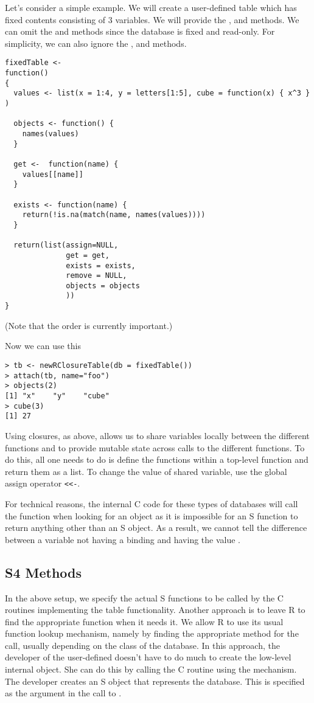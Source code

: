 \documentclass{article}
\begin{document}
Let's consider a simple example. We will create a user-defined table
which has fixed contents consisting of $3$ variables.  We will provide
the ,  and 
methods. We can omit the  and 
methods since the database is fixed and read-only.  For simplicity, we
can also ignore the ,  and
 methods.

\begin{verbatim}
fixedTable <-
function()
{
  values <- list(x = 1:4, y = letters[1:5], cube = function(x) { x^3 } )

  objects <- function() {
    names(values)
  }
  
  get <-  function(name) {
    values[[name]]
  }

  exists <- function(name) {
    return(!is.na(match(name, names(values))))
  }

  return(list(assign=NULL, 
              get = get,
              exists = exists,
              remove = NULL,
              objects = objects
              ))
}
\end{verbatim}
(Note that the order is currently important.)

Now  we can use this
\begin{verbatim}
> tb <- newRClosureTable(db = fixedTable())
> attach(tb, name="foo")
> objects(2)
[1] "x"    "y"    "cube"
> cube(3)
[1] 27 
\end{verbatim}

Using closures, as above, allows us to share variables locally between
the different functions and to provide mutable state across calls to
the different functions.  To do this, all one needs to do is define
the functions within a top-level function and return them as a list.
To change the value of shared variable, use the global assign operator
\verb+<<-+.


For technical reasons, the internal C code for these types of
databases will call the  function when looking for an
object as it is impossible for an S function to return anything other
than an S object.  As a result, we cannot tell the difference between
a variable not having a binding and having the value \SNull.




\subsection{S4 Methods}
In the above setup, we specify the actual S functions to be called by
the C routines implementing the table functionality.  Another approach
is to leave R to find the appropriate function when it needs it. We
allow R to use its usual function lookup mechanism, namely by finding
the appropriate method for the call, usually depending on the class of
the database.  In this approach, the developer of the user-defined
doesn't have to do much to create the low-level internal
 object. She can do this by calling the C
routine  using the 
mechanism.  The developer creates an S object that represents the
database.  This is specified as the argument in the call to
.
\end{document}
